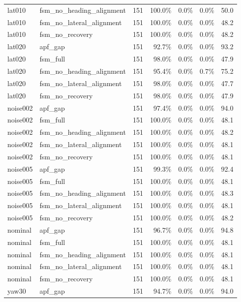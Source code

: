 \begin{tabular}{llrrrrr}
lat010 & fsm\_no\_heading\_alignment & 151 & 100.0\% & 0.0\% & 0.0\% & 50.0 \\
lat010 & fsm\_no\_lateral\_alignment & 151 & 100.0\% & 0.0\% & 0.0\% & 48.2 \\
lat010 & fsm\_no\_recovery & 151 & 100.0\% & 0.0\% & 0.0\% & 48.2 \\
lat020 & apf\_gap & 151 & 92.7\% & 0.0\% & 0.0\% & 93.2 \\
lat020 & fsm\_full & 151 & 98.0\% & 0.0\% & 0.0\% & 47.9 \\
lat020 & fsm\_no\_heading\_alignment & 151 & 95.4\% & 0.0\% & 0.7\% & 75.2 \\
lat020 & fsm\_no\_lateral\_alignment & 151 & 98.0\% & 0.0\% & 0.0\% & 47.7 \\
lat020 & fsm\_no\_recovery & 151 & 98.0\% & 0.0\% & 0.0\% & 47.9 \\
noise002 & apf\_gap & 151 & 97.4\% & 0.0\% & 0.0\% & 94.0 \\
noise002 & fsm\_full & 151 & 100.0\% & 0.0\% & 0.0\% & 48.1 \\
noise002 & fsm\_no\_heading\_alignment & 151 & 100.0\% & 0.0\% & 0.0\% & 48.2 \\
noise002 & fsm\_no\_lateral\_alignment & 151 & 100.0\% & 0.0\% & 0.0\% & 48.1 \\
noise002 & fsm\_no\_recovery & 151 & 100.0\% & 0.0\% & 0.0\% & 48.1 \\
noise005 & apf\_gap & 151 & 99.3\% & 0.0\% & 0.0\% & 92.4 \\
noise005 & fsm\_full & 151 & 100.0\% & 0.0\% & 0.0\% & 48.1 \\
noise005 & fsm\_no\_heading\_alignment & 151 & 100.0\% & 0.0\% & 0.0\% & 48.3 \\
noise005 & fsm\_no\_lateral\_alignment & 151 & 100.0\% & 0.0\% & 0.0\% & 48.1 \\
noise005 & fsm\_no\_recovery & 151 & 100.0\% & 0.0\% & 0.0\% & 48.2 \\
nominal & apf\_gap & 151 & 96.7\% & 0.0\% & 0.0\% & 94.8 \\
nominal & fsm\_full & 151 & 100.0\% & 0.0\% & 0.0\% & 48.1 \\
nominal & fsm\_no\_heading\_alignment & 151 & 100.0\% & 0.0\% & 0.0\% & 48.1 \\
nominal & fsm\_no\_lateral\_alignment & 151 & 100.0\% & 0.0\% & 0.0\% & 48.1 \\
nominal & fsm\_no\_recovery & 151 & 100.0\% & 0.0\% & 0.0\% & 48.1 \\
yaw30 & apf\_gap & 151 & 94.7\% & 0.0\% & 0.0\% & 94.0 \\

\end{tabular}
